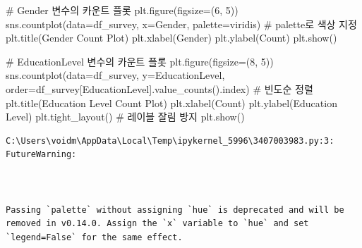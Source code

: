 \documentclass[
  letterpaper,
]{book}
\newenvironment{Shaded}{\begin{snugshade}}{\end{snugshade}}
\newcommand{\CommentTok}[1]{\textcolor[rgb]{0.37,0.37,0.37}{#1}}
\newcommand{\DecValTok}[1]{\textcolor[rgb]{0.68,0.00,0.00}{#1}}
\newcommand{\NormalTok}[1]{\textcolor[rgb]{0.00,0.23,0.31}{#1}}
\newcommand{\OperatorTok}[1]{\textcolor[rgb]{0.37,0.37,0.37}{#1}}
\newcommand{\StringTok}[1]{\textcolor[rgb]{0.13,0.47,0.30}{#1}}
\begin{document}
\begin{Shaded}
\begin{Highlighting}[]
\CommentTok{\# Gender 변수의 카운트 플롯}
\NormalTok{plt.figure(figsize}\OperatorTok{=}\NormalTok{(}\DecValTok{6}\NormalTok{, }\DecValTok{5}\NormalTok{))}
\NormalTok{sns.countplot(data}\OperatorTok{=}\NormalTok{df\_survey, x}\OperatorTok{=}\StringTok{\textquotesingle{}Gender\textquotesingle{}}\NormalTok{, palette}\OperatorTok{=}\StringTok{\textquotesingle{}viridis\textquotesingle{}}\NormalTok{) }\CommentTok{\# palette로 색상 지정}
\NormalTok{plt.title(}\StringTok{\textquotesingle{}Gender Count Plot\textquotesingle{}}\NormalTok{)}
\NormalTok{plt.xlabel(}\StringTok{\textquotesingle{}Gender\textquotesingle{}}\NormalTok{)}
\NormalTok{plt.ylabel(}\StringTok{\textquotesingle{}Count\textquotesingle{}}\NormalTok{)}
\NormalTok{plt.show()}

\CommentTok{\# EducationLevel 변수의 카운트 플롯}
\NormalTok{plt.figure(figsize}\OperatorTok{=}\NormalTok{(}\DecValTok{8}\NormalTok{, }\DecValTok{5}\NormalTok{))}
\NormalTok{sns.countplot(data}\OperatorTok{=}\NormalTok{df\_survey, y}\OperatorTok{=}\StringTok{\textquotesingle{}EducationLevel\textquotesingle{}}\NormalTok{, order}\OperatorTok{=}\NormalTok{df\_survey[}\StringTok{\textquotesingle{}EducationLevel\textquotesingle{}}\NormalTok{].value\_counts().index) }\CommentTok{\# 빈도순 정렬}
\NormalTok{plt.title(}\StringTok{\textquotesingle{}Education Level Count Plot\textquotesingle{}}\NormalTok{)}
\NormalTok{plt.xlabel(}\StringTok{\textquotesingle{}Count\textquotesingle{}}\NormalTok{)}
\NormalTok{plt.ylabel(}\StringTok{\textquotesingle{}Education Level\textquotesingle{}}\NormalTok{)}
\NormalTok{plt.tight\_layout() }\CommentTok{\# 레이블 잘림 방지}
\NormalTok{plt.show()}
\end{Highlighting}
\end{Shaded}

\begin{verbatim}
C:\Users\voidm\AppData\Local\Temp\ipykernel_5996\3407003983.py:3: FutureWarning:



Passing `palette` without assigning `hue` is deprecated and will be removed in v0.14.0. Assign the `x` variable to `hue` and set `legend=False` for the same effect.

\end{verbatim}
\end{document}
